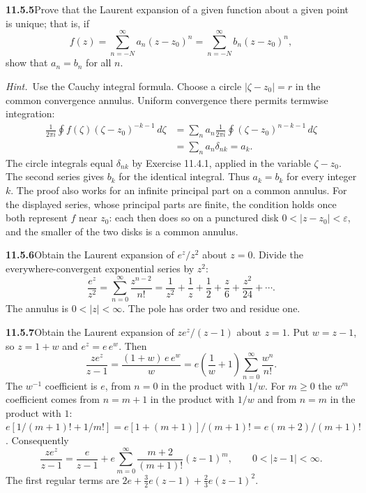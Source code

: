 \par\bigskip
\noindent\textbf{11.5.5}\quad Prove that the Laurent expansion of a given
function about a given point is unique; that is, if
\[
f(z)=\sum_{n=-N}^{\infty}a_{n}(z-z_{0})^{n}
=\sum_{n=-N}^{\infty}b_{n}(z-z_{0})^{n},
\]
 show that $a_{n}=b_{n}$ for all $n$.

\emph{Hint.}~Use the Cauchy integral formula.
\solution
Choose a circle $|\zeta-z_0|=r$ in the common convergence annulus.
Uniform convergence there permits termwise integration:
\[
\begin{aligned}
\frac1{2\pi i}\oint f(\zeta)(\zeta-z_0)^{-k-1}\,d\zeta
&=\sum_n a_n\frac1{2\pi i}\oint
(\zeta-z_0)^{n-k-1}\,d\zeta\\
&=\sum_n a_n\delta_{nk}=a_k.
\end{aligned}
\]
The circle integrals equal $\delta_{nk}$ by Exercise 11.4.1, applied in
the variable $\zeta-z_0$.
The second series gives $b_k$ for the identical integral.
Thus $\boxed{a_k=b_k}$ for every integer $k$.
The proof also works for an infinite principal part on a common annulus.
For the displayed series, whose principal parts are finite, the
condition holds once both represent $f$ near $z_0$: each then does so on
a punctured disk $0<|z-z_0|<\varepsilon$, and the smaller of the two
disks is a common annulus.

\par\bigskip
\noindent\textbf{11.5.6}\quad Obtain the Laurent expansion of $e^{z}/z^{2}$
about $z=0$.
\solution
Divide the everywhere-convergent exponential series by $z^2$:
\[
\boxed{\frac{e^z}{z^2}
=\sum_{n=0}^\infty\frac{z^{n-2}}{n!}
=\frac1{z^2}+\frac1z+\frac12+\frac z6+\frac{z^2}{24}+\cdots}.
\]
The annulus is $0<|z|<\infty$. The pole has order two and residue one.

\par\bigskip
\noindent\textbf{11.5.7}\quad Obtain the Laurent expansion of
$ze^{z}/(z-1)$ about $z=1$.
\solution
Put $w=z-1$, so $z=1+w$ and $e^z=e\,e^w$. Then
\[
\frac{ze^z}{z-1}=\frac{(1+w)\,e\,e^w}{w}
=e\left(\frac1w+1\right)\sum_{n=0}^\infty\frac{w^n}{n!}.
\]
The $w^{-1}$ coefficient is $e$, from $n=0$ in the product with $1/w$.
For $m\ge0$ the $w^m$ coefficient comes from $n=m+1$ in the product
with $1/w$ and from $n=m$ in the product with $1$:
$e[1/(m+1)!+1/m!]=e[1+(m+1)]/(m+1)!=e(m+2)/(m+1)!$.
Consequently
\[
\boxed{\frac{ze^z}{z-1}
=\frac e{z-1}+e\sum_{m=0}^\infty
\frac{m+2}{(m+1)!}(z-1)^m},\qquad0<|z-1|<\infty.
\]
The first regular terms are $2e+\frac32e(z-1)+\frac23e(z-1)^2$.

